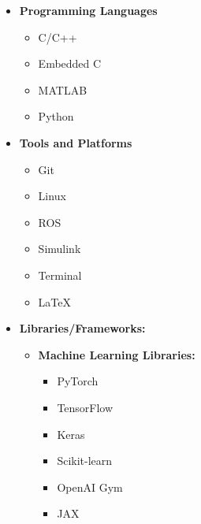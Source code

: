 \documentclass[12pt]{article}
\begin{document}
\begin{itemize}
	\item \textbf{Programming Languages}
	\begin{multicols}{4}
		\begin{itemize}
			\item C/C++
			\item Embedded C
			\item MATLAB
			\item Python \faPython
		\end{itemize}
	\end{multicols}
	\item \textbf{Tools and Platforms}	
	\begin{multicols}{3}
		\begin{itemize}
			\item Git \faGitSquare
			\item Linux \faLinux
			\item ROS
			\item Simulink
			\item Terminal \faTerminal
			\item \LaTeX
		\end{itemize}
	\end{multicols}
	\item \textbf{Libraries/Frameworks:} 
	\begin{itemize}
		\item \textbf{Machine Learning Libraries:}
		\begin{multicols}{2}
			\begin{itemize}
				\item PyTorch
				\item TensorFlow
				\item Keras
				\item Scikit-learn
				\item OpenAI Gym
				\item JAX
			\end{itemize}
		\end{multicols}
	

\end{itemize}
\end{itemize}
\end{document}
